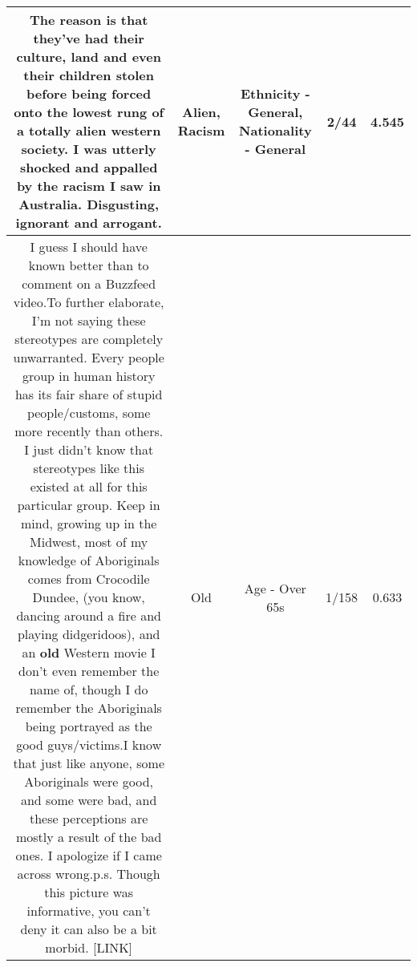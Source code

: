 \documentclass[11pt]{article}
\newlength\mylength
\begin{document}
\begin{center}
\begin{longtable}{|C{.65\mylength}|C{.30\mylength}|C{.12\mylength}|C{.12\mylength}|C{.12\mylength}|}
  \small The reason is that they've had their culture, land and even their children stolen before being forced onto the lowest rung of a totally \textbf{alien} western society. I was utterly shocked and appalled by the \textbf{racism} I saw in Australia. Disgusting, ignorant and arrogant.\normalsize   & Alien, Racism & Ethnicity - General, Nationality - General & 2/44 & 4.545 \\  \hline
  \small I guess I should have known better than to comment on a Buzzfeed video.To further elaborate, I'm not saying these stereotypes are completely unwarranted. Every people group in human history has its fair share of stupid people/customs, some more recently than others. I just didn't know that stereotypes like this existed at all for this particular group. Keep in mind, growing up in the Midwest, most of my knowledge of Aboriginals comes from Crocodile Dundee, (you know, dancing around a fire and playing didgeridoos), and an \textbf{old} Western movie I don't even remember the name of, though I do remember the Aboriginals being portrayed as the good guys/victims.I know that just like anyone, some Aboriginals were good, and some were bad, and these perceptions are mostly a result of the bad ones. I apologize if I came across wrong.p.s. Though this picture was informative, you can't deny it can also be a bit morbid. [LINK] \normalsize   & Old & Age - Over 65s & 1/158 & 0.633 \\  \hline

\end{longtable}
\end{center}
\end{document}

